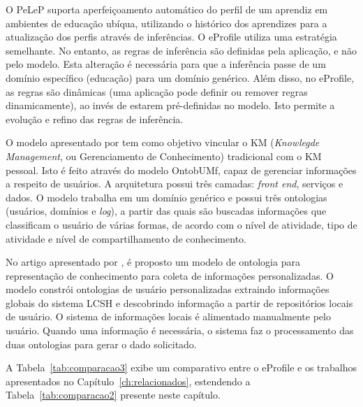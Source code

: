 O PeLeP \cite{pelep} suporta aperfeiçoamento automático do perfil de um aprendiz em ambientes de educação ubíqua, utilizando o histórico dos aprendizes para a atualização dos perfis através de inferências. O eProfile utiliza uma estratégia semelhante. No entanto, as regras de inferência são definidas pela aplicação, e não pelo modelo. Esta alteração é necessária para que a inferência passe de um domínio específico (educação) para um domínio genérico. Além disso, no eProfile, as regras são dinâmicas (uma aplicação pode definir ou remover regras dinamicamente), ao invés de estarem pré-definidas no modelo. Isto permite a evolução e refino das regras de inferência.

O modelo apresentado por  tem como objetivo vincular o KM ({\it Knowlegde Management}, ou Gerenciamento de Conhecimento) tradicional com o KM pessoal. Isto é feito através do modelo OntobUMf, capaz de gerenciar informações a respeito de usuários. A arquitetura possui três camadas: {\it front end}, serviços e dados. O modelo trabalha em um domínio genérico e possui três ontologias (usuários, domínios e {\it log}), a partir das quais são buscadas informações que classificam o usuário de várias formas, de acordo com o nível de atividade, tipo de atividade e nível de compartilhamento de conhecimento.

No artigo apresentado por , é proposto um modelo de ontologia para representação de conhecimento para coleta de informações personalizadas. O modelo constrói ontologias de usuário personalizadas extraindo informações globais do sistema LCSH e descobrindo informação a partir de repositórios locais de usuário. O sistema de informações locais é alimentado manualmente pelo usuário. Quando uma informação é necessária, o sistema faz o processamento das duas ontologias para gerar o dado solicitado.

A Tabela~\ref{tab:comparacao3} exibe um comparativo entre o eProfile e os trabalhos apresentados no Capítulo~\ref{ch:relacionados}, estendendo a Tabela~\ref{tab:comparacao2} presente neste capítulo.

